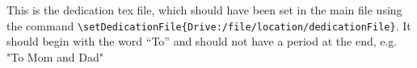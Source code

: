 This is the dedication tex file, which should have been set in the main file using the command \verb|\setDedicationFile{Drive:/file/location/dedicationFile}|. It should begin with the word “To”
and should not have a period at the end, e.g. "To Mom and Dad"